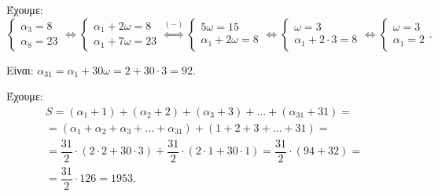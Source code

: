 
\begin{alist}
\item Έχουμε:
\[\begin{cases} \alpha_3 = 8 \\ \alpha_8 = 23 \end{cases} \Leftrightarrow \begin{cases} \alpha_1 + 2\omega = 8 \\ \alpha_1 + 7\omega = 23 \end{cases} \stackrel{(-)}{\Leftrightarrow} \begin{cases} 5\omega = 15 \\ \alpha_1 + 2\omega = 8 \end{cases} \Leftrightarrow \begin{cases} \omega = 3 \\ \alpha_1 + 2 \cdot 3 = 8 \end{cases} \Leftrightarrow \begin{cases} \omega = 3 \\ \alpha_1 = 2 \end{cases}.\]

\item Είναι: $\alpha_{31} = \alpha_1 + 30\omega = 2 + 30 \cdot 3 = 92$.

\item Έχουμε:
\begin{gather*}
S = (\alpha_1 + 1) + (\alpha_2 + 2) + (\alpha_3 + 3) + \dots + (\alpha_{31} + 31) = \\
= (\alpha_1 + \alpha_2 + \alpha_3 + \dots + \alpha_{31}) + (1 + 2 + 3 + \dots + 31) = \\
= \dfrac{31}{2} \cdot (2 \cdot 2 + 30 \cdot 3) + \dfrac{31}{2} \cdot (2 \cdot 1 + 30 \cdot 1) = \dfrac{31}{2} \cdot (94 + 32) = \\
= \dfrac{31}{2} \cdot 126 = 1953.
\end{gather*}
\end{alist}

